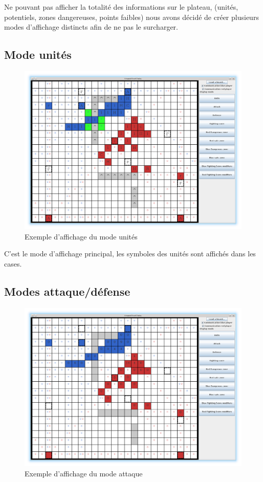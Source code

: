 		Ne pouvant pas afficher la totalité des informations sur le plateau, (unités, potentiels, zones dangereuses, points faibles) nous
		avons décidé de créer plusieurs modes d'affichage distincts afin de ne pas le surcharger.

		\subsection{Mode unités}
			\begin{figure}[!h]
				\centerline{\includegraphics[scale=0.4]{images/screen_units.png}}
				\caption{Exemple d'affichage du mode unités}
			\end{figure}

			C'est le mode d'affichage principal, les symboles des unités sont affichés dans les cases.
			\clearpage

		\subsection{Modes attaque/défense}

			\begin{figure}[!h]
				\centerline{\includegraphics[scale=0.4]{images/screen_def.png}}
				\caption{Exemple d'affichage du mode attaque}
			\end{figure}

